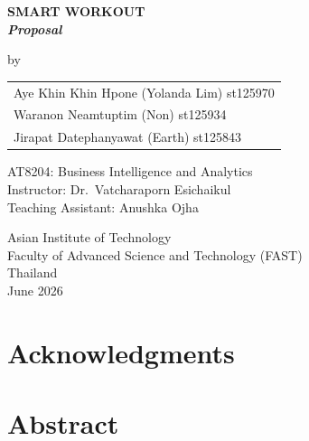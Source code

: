 ﻿%
\begin{titlepage}
\begin{center}
\vspace*{0.5cm}
{\fontsize{14}{18}\bfseries\MakeUppercase{Smart Workout}\\[4pt]
\normalsize\mdseries\textit{Proposal
}}

\vspace{0.6cm}
{\normalsize by}

    \vspace{1em}
    \begin{tabular}{l}
        Aye Khin Khin Hpone (Yolanda Lim) st125970\\
        Waranon Neamtuptim (Non) st125934\\
        Jirapat Datephanyawat (Earth) st125843
    \end{tabular}

\vfill
{\normalsize AT8204: Business Intelligence and Analytics}\\[6pt]
{\normalsize Instructor: Dr.\ Vatcharaporn Esichaikul}\\[4pt]
{\normalsize Teaching Assistant: Anushka Ojha}

\vfill
{\normalsize
Asian Institute of Technology\\[4pt]
Faculty of Advanced Science and Technology (FAST)\\[4pt]
Thailand\\[8pt]
June 2026
}
\end{center}
\end{titlepage}

\chapter*{Acknowledgments}


\chapter*{Abstract}


\newpage\tableofcontents

\newpage
{}
